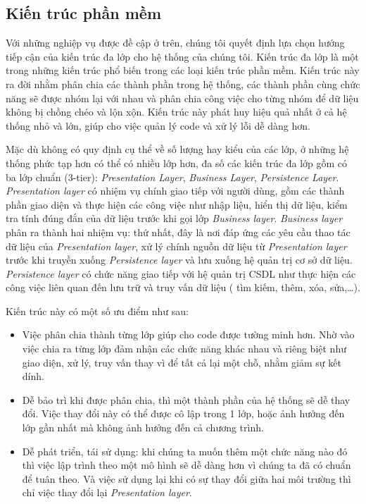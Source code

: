 \subsection{Kiến trúc phần mềm}
Với những nghiệp vụ được đề cập ở trên, chúng tôi quyết định lựa chọn hướng
tiếp cận của kiến trúc đa lớp cho hệ thống của chúng tôi. Kiến trúc đa lớp là
một trong những kiến trúc phổ biến trong các loại kiến trúc phần mềm. Kiến trúc
này ra đời nhằm phân chia các thành phần trong hệ thống, các thành phần cùng
chức năng sẽ được nhóm lại với nhau và phân chia công việc cho từng nhóm để dữ
liệu không bị chồng chéo và lộn xộn. Kiến trúc này phát huy hiệu quả nhất ở cả hệ 
thống nhỏ và lớn, giúp cho việc quản lý code và xử lý lỗi dễ
dàng hơn.
\par
Mặc dù không có quy định cụ thể về số lượng hay kiểu của các lớp, ở những hệ
thống phức tạp hơn có thể có nhiều lớp hơn, đa số các kiến trúc đa lớp gồm có
ba lớp chuẩn (3-tier): \emph{Presentation Layer}, \emph{Business Layer},
\emph{Persistence Layer}. \emph{Presentation layer} có nhiệm vụ chính giao tiếp với
người dùng, gồm các thành phần giao diện và thực hiện các công việc như nhập
liệu, hiển thị dữ liệu, kiểm tra tính đúng đắn của dữ liệu trước khi gọi lớp
\emph{Business layer}. \emph{Business layer} phân ra thành hai nhiệm vụ: thứ
nhất, đây là nơi đáp ứng các yêu cầu thao tác dữ liệu của \emph{Presentation
    layer}, xử lý chính nguồn dữ liệu từ \emph{Presentation layer} trước khi truyền
xuống \emph{Persistence layer} và lưu xuống hệ quản trị cơ sở dữ liệu. \emph{Persistence
    layer} có chức năng giao tiếp với hệ quản trị CSDL như thực hiện các công việc
liên quan đến lưu trữ và truy vấn dữ liệu ( tìm kiếm, thêm, xóa, sửa,…).
\par
Kiến trúc này có một số ưu điểm như sau:
\begin{itemize}
    \item Việc phân chia thành từng lớp giúp cho code được tường minh hơn. Nhờ vào việc
          chia ra từng lớp đảm nhận các chức năng khác nhau và riêng biệt như giao diện,
          xử lý, truy vấn thay vì để tất cả lại một chỗ, nhằm giảm sự kết dính.
    \item Dễ bảo trì khi được phân chia, thì một thành phần của hệ thống sẽ dễ thay đổi.
          Việc thay đổi này có thể được cô lập trong 1 lớp, hoặc ảnh hưởng đến lớp gần
          nhất mà không ảnh hưởng đến cả chương trình.
    \item Dễ phát triển, tái sử dụng: khi chúng ta muốn thêm một chức năng nào đó thì
          việc lập trình theo một mô hình sẽ dễ dàng hơn vì chúng ta đã có chuẩn để tuân
          theo. Và việc sử dụng lại khi có sự thay đổi giữa hai môi trường thì chỉ việc
          thay đổi lại \emph{Presentation layer}.
\end{itemize}

